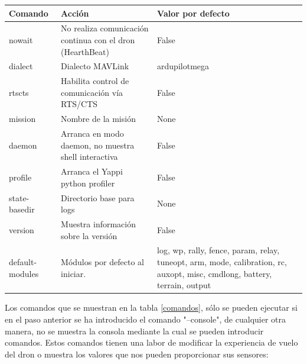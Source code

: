 \begin{center}
  \label{scriptArranqueComandos2}
  \begin{tabular}{ | l | p{8cm} | p{5cm} |}
  \hline
    Comando & Acción & Valor por defecto \\ \hline
    nowait&No realiza comunicación continua con el dron (HearthBeat) &  False\\ \hline
    dialect & Dialecto MAVLink& ardupilotmega \\ \hline
    rtscts& Habilita control de comunicación vía RTS/CTS&  False\\ \hline
    mission& Nombre de la misión& None \\ \hline
    daemon & Arranca en modo daemon, no muestra shell interactiva & False \\ \hline
    profile& Arranca el Yappi python profiler& False \\ \hline
    state-basedir& Directorio base para logs& None \\ \hline
    version& Muestra información sobre la versión& False \\ \hline
    default-modules& Módulos por defecto al iniciar.& log, wp, rally, fence, param, relay, tuneopt, arm, mode, calibration, rc, auxopt, misc, cmdlong, battery, terrain, output \\ \hline
    \hline
  \end{tabular}
\end{center}

Los comandos que se muestran en la tabla \ref{comandos}, sólo se pueden ejecutar si en el paso anterior se ha introducido el comando "--console", de cualquier otra manera, no se muestra la consola mediante la cual se pueden introducir comandos. Estos comandos tienen una labor de modificar la experiencia de vuelo del dron o muestra los valores que nos pueden proporcionar sus sensores:

